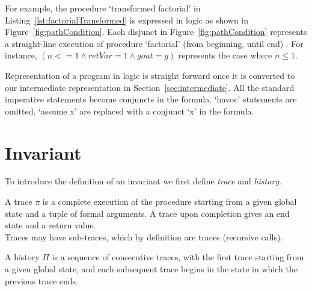\documentclass{llncs}
\newcommand{\foo}{\textit{foo}}
\newcommand{\trace}{\pi}
\newcommand{\history}{\Pi}
\newcommand{\pathCondition}{\mathit{T_{\foo}}}
\begin{document}
For example, the procedure `transformed factorial' in
Listing~\ref{lst:factorialTransformed} is expressed in logic as shown
in Figure~\ref{fig:pathCondition}. Each disjunct in
Figure~\ref{fig:pathCondition} represents a straight-line execution of
procedure `factorial' (from beginning, until end) . For instance, $(n
<= 1 \wedge retVar = 1 \wedge gout = g)$ represents the case where $n
\leq 1$.

Representation of a program in logic is straight forward once it is
converted to our intermediate representation in
Section~\ref{sec:intermediate}. All the standard imperative statements
become conjuncts in the formula. `havoc' statements are omitted.
`assume x' are replaced with a conjunct `x' in the formula.

\section{Invariant}

To introduce the definition of an invariant we first define
\textit{trace} and \textit{history}.

\begin{definition}[trace]
  A trace $\trace$ is a complete execution of the procedure starting
  from a given global state and a tuple of formal arguments. A trace
  upon completion gives an end state and a return value.\\ Traces may
  have sub-traces, which by definition are traces (recursive calls).
\end{definition}

\begin{definition}[history]
  A history $\history$ is a sequence of consecutive traces, with the
  first trace starting from a given global state, and each subsequent
  trace begins in the state in which the previous trace ends.
\end{definition}
\end{document}
